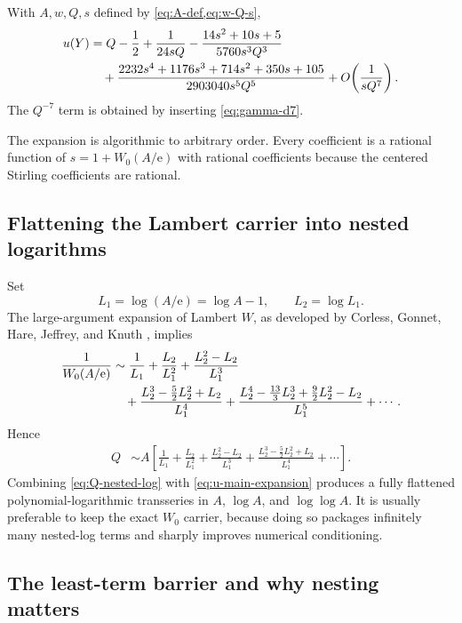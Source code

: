 \documentclass[11pt]{article}
\numberwithin{equation}{section}
\theoremstyle{mainthm}
\theoremstyle{defstyle}
\theoremstyle{remark}
\newcommand{\e}{\mathrm e}
\begin{document}
\begin{resultbox}
With \(A,w,Q,s\) defined by \cref{eq:A-def,eq:w-Q-s},
\begin{align}
 u(Y)
 &=Q-\frac12+\frac{1}{24sQ}
 -\frac{14s^2+10s+5}{5760s^3Q^3}\notag\\
 &\quad
 +\frac{2232s^4+1176s^3+714s^2+350s+105}{2903040s^5Q^5}
 +O\!\left(\frac{1}{sQ^7}\right).
 \label{eq:u-main-expansion}
\end{align}
The \(Q^{-7}\) term is obtained by inserting \cref{eq:gamma-d7}.
\end{resultbox}

The expansion is algorithmic to arbitrary order.  Every coefficient is a rational function of \(s=1+W_0(A/\e)\) with rational coefficients because the centered Stirling coefficients are rational.

\subsection{Flattening the Lambert carrier into nested logarithms}

Set
\begin{equation}\label{eq:L1-L2}
 L_1=\log(A/\e)=\log A-1,
 \qquad L_2=\log L_1.
\end{equation}
The large-argument expansion of Lambert \(W\), as developed by Corless, Gonnet, Hare, Jeffrey, and Knuth \cite{Corless1996}, implies
\begin{align}
 \frac1{W_0(A/\e)}
 &\sim \frac1{L_1}
 +\frac{L_2}{L_1^2}
 +\frac{L_2^2-L_2}{L_1^3}\notag\\
 &\quad
 +\frac{L_2^3-\tfrac52L_2^2+L_2}{L_1^4}
 +\frac{L_2^4-\tfrac{13}{3}L_2^3+\tfrac92L_2^2-L_2}{L_1^5}
 +\cdots.
 \label{eq:inverse-W-nested-log}
\end{align}
Hence
\begin{align}
 Q
 &\sim A\left[
 \frac1{L_1}+\frac{L_2}{L_1^2}
 +\frac{L_2^2-L_2}{L_1^3}
 +\frac{L_2^3-\tfrac52L_2^2+L_2}{L_1^4}
 +\cdots\right].
 \label{eq:Q-nested-log}
\end{align}
Combining \cref{eq:Q-nested-log} with \cref{eq:u-main-expansion} produces a fully flattened polynomial-logarithmic transseries in \(A\), \(\log A\), and \(\log\log A\).  It is usually preferable to keep the exact \(W_0\) carrier, because doing so packages infinitely many nested-log terms and sharply improves numerical conditioning.

\subsection{The least-term barrier and why nesting matters}
\end{document}
